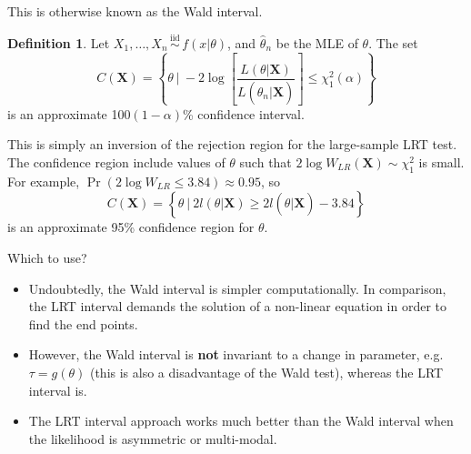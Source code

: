 \documentclass[
]{book}
\newcommand{\bX}{{\boldsymbol X}}
\newcommand{\iid}{\,\overset{\text{iid}}{\sim}\,}
\theoremstyle{definition}
\newtheorem{definition}{Definition}[chapter]
\theoremstyle{definition}
\theoremstyle{definition}
\theoremstyle{definition}
\theoremstyle{remark}
\begin{document}
This is otherwise known as the Wald interval.

\begin{definition}
Let \(X_1,\dots,X_n\iid f(x|\theta)\), and \(\hat\theta_n\) be the MLE of \(\theta\).
The set
\[
C(\bX) = \left\{\theta \ \bigg| \ -2\log \left[ \frac{L(\theta|\bX)}{L(\hat\theta_n|\bX)} \right]  \leq \chi^2_1(\alpha)  \right\}
\]
is an approximate 100\((1-\alpha)\)\% confidence interval.
\end{definition}

This is simply an inversion of the rejection region for the large-sample LRT test.
The confidence region include values of \(\theta\) such that \(2\log W_{LR}(\bX)\sim\chi^2_1\) is small. For example, \(\Pr(2\log W_{LR} \leq 3.84) \approx 0.95\), so
\[
C(\bX) = \left\{\theta \ \bigg| \ 2 l(\theta |\bX) \geq  2l(\hat\theta | \bX) - 3.84  \right\}
\]
is an approximate 95\% confidence region for \(\theta\).

Which to use?

\begin{itemize}
\item
  Undoubtedly, the Wald interval is simpler computationally. In comparison, the LRT interval demands the solution of a non-linear equation in order to find the end points.
\item
  However, the Wald interval is \textbf{not} invariant to a change in parameter, e.g.~\(\tau=g(\theta)\) (this is also a disadvantage of the Wald test), whereas the LRT interval is.
\item
  The LRT interval approach works much better than the Wald interval when the likelihood is asymmetric or multi-modal.
\end{itemize}
\end{document}
